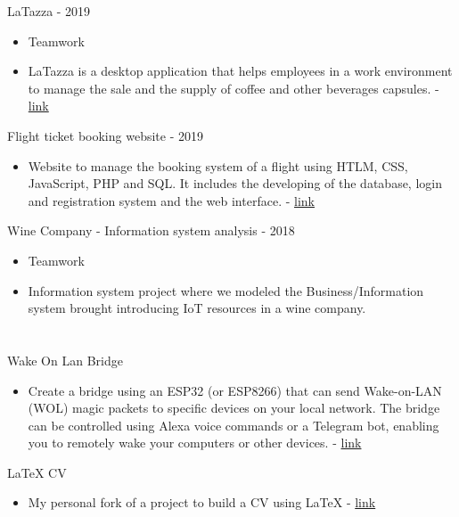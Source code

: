 \documentclass[]{twentysecondcv}
\begin{document}
LaTazza - 2019
\begin{itemize}
	\item Teamwork
	\item LaTazza is a desktop application that helps employees in a work environment to manage the sale and the supply of coffee and other beverages capsules. - \href{https://github.com/Frequel/LaTazza}{\textcolor{cerulean}{link}}
\end{itemize}

Flight ticket booking website - 2019
\begin{itemize}
	\item Website to manage the booking system of a flight using HTLM, CSS, JavaScript, PHP and SQL. It includes the developing of the database, login and registration system and the web interface. - \href{https://github.com/Frequel/Airplane-reservation-managment-website}{\textcolor{cerulean}{link}}
\end{itemize}

Wine Company - Information system analysis - 2018
\begin{itemize}
	\item Teamwork
	\item Information system project where we modeled the Business/Information system brought introducing IoT resources in a wine company.
\end{itemize}

\section{\raisedrule[0\baselineskip]{1pt}\circled{}}
Wake On Lan Bridge
\begin{itemize}
	\item Create a bridge using an ESP32 (or ESP8266) that can send Wake-on-LAN (WOL) magic packets to specific devices on your local network. The bridge can be controlled using Alexa voice commands or a Telegram bot, enabling you to remotely wake your computers or other devices.  - \href{https://github.com/Frequel/WOL_bridge}{\textcolor{cerulean}{link}}
\end{itemize}
LaTeX CV
\begin{itemize}
	\item My personal fork of a project to build a CV using LaTeX - \href{https://github.com/Frequel/TwentySecondsCurriculumVitae-LaTex}{\textcolor{cerulean}{link}}
\end{itemize}

\end{document}
